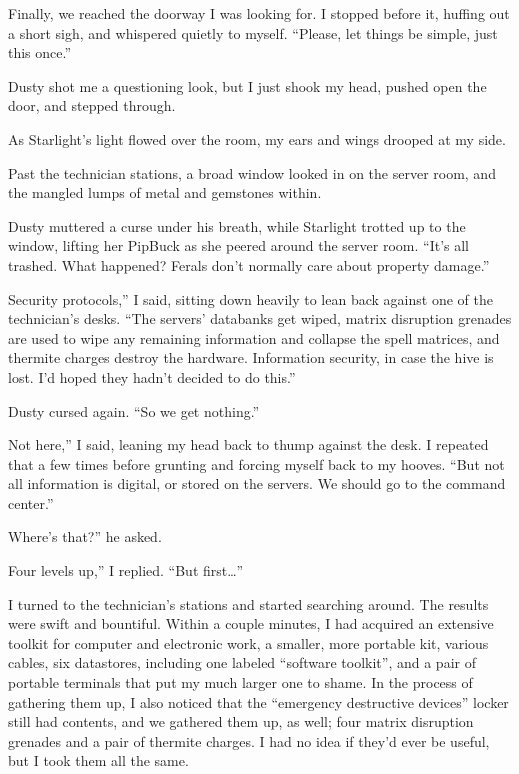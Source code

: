 Finally, we reached the doorway I was looking for. I stopped before it, huffing out a short sigh, and whispered quietly to myself. “Please, let things be simple, just this once.”

Dusty shot me a questioning look, but I just shook my head, pushed open the door, and stepped through.

As Starlight’s light flowed over the room, my ears and wings drooped at my side.

Past the technician stations, a broad window looked in on the server room, and the mangled lumps of metal and gemstones within.

Dusty muttered a curse under his breath, while Starlight trotted up to the window, lifting her PipBuck as she peered around the server room. “It’s all trashed. What happened? Ferals don’t normally care about property damage.”

\leavevmode{}Security protocols,” I said, sitting down heavily to lean back against one of the technician’s desks. “The servers’ databanks get wiped, matrix disruption grenades are used to wipe any remaining information and collapse the spell matrices, and thermite charges destroy the hardware. Information security, in case the hive is lost. I’d hoped they hadn’t decided to do this.”

Dusty cursed again. “So we get nothing.”

\leavevmode{}Not here,” I said, leaning my head back to thump against the desk. I repeated that a few times before grunting and forcing myself back to my hooves. “But not all information is digital, or stored on the servers. We should go to the command center.”

\leavevmode{}Where’s that?” he asked.

\leavevmode{}Four levels up,” I replied. “But first…”

I turned to the technician’s stations and started searching around. The results were swift and bountiful. Within a couple minutes, I had acquired an extensive toolkit for computer and electronic work, a smaller, more portable kit, various cables, six datastores, including one labeled “software toolkit”, and a pair of portable terminals that put my much larger one to shame. In the process of gathering them up, I also noticed that the “emergency destructive devices” locker still had contents, and we gathered them up, as well; four matrix disruption grenades and a pair of thermite charges. I had no idea if they’d ever be useful, but I took them all the same.

